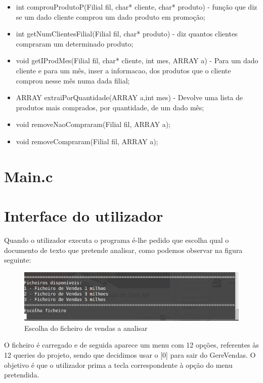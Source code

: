 \begin{itemize}
\item	int comprouProdutoP(Filial fil, char* cliente, char* produto) - função que diz se um dado cliente comprou um dado produto em promoção; 

\item	int getNumClientesFilial(Filial fil, char* produto) - diz quantos clientes compraram um determinado produto; 

\item	void getIProdMes(Filial fil, char* cliente, int mes, ARRAY a) - Para um dado cliente e para um mês, inser a informacao, dos produtos que o cliente comprou nesse mês numa dada filial; 
\item	ARRAY extraiPorQuantidade(ARRAY a,int mes) - Devolve uma lista de produtos mais comprados, por quantidade, de um dado mês; 
\item	void removeNaoCompraram(Filial fil, ARRAY a);
\item	void removeCompraram(Filial fil, ARRAY a);
\end{itemize}


\chapter{Main.c}




\chapter{Interface do utilizador}
Quando o utilizador executa o programa é-lhe pedido que escolha qual o documento de texto que pretende analisar, como podemos observar na figura seguinte: 

\begin{figure}[h!]
	\centering
	\includegraphics[scale=0.4]{1querie.png}  
	\caption{Escolha do ficheiro de vendas a analisar}  
\end{figure}

O ficheiro é carregado e de seguida aparece um menu com 12 opções, referentes às 12 queries do projeto, sendo que decidimos usar o [0] para sair do GereVendas. O objetivo é que o utilizador prima a tecla correspondente à opção do menu pretendida.

